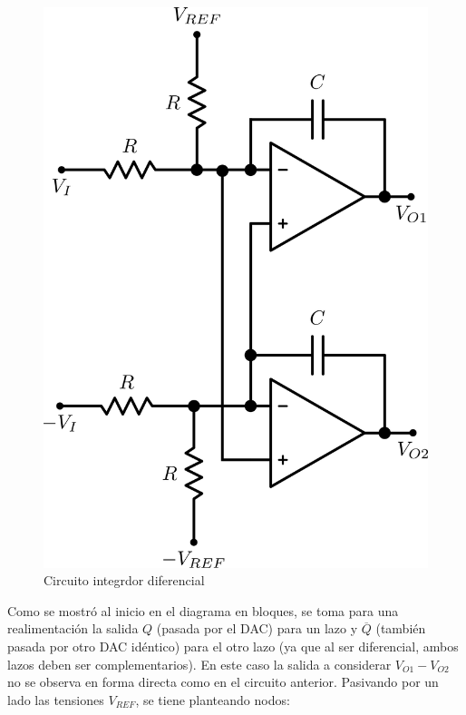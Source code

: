 \documentclass[assd_tp3_main.tex]{subfiles}
\begin{document}
\begin{figure}[!ht]
\begin{centering}
\includegraphics[scale=0.45]{images/ej5/IntegradorDif.png}
\par\end{centering}
\caption{Circuito integrdor diferencial}
\end{figure}

Como se mostró al inicio en el diagrama en bloques, se toma para una realimentación la salida $Q$ (pasada por el DAC) para un lazo y $\overline{Q}$ (también pasada por otro DAC idéntico) para el otro lazo (ya que al ser diferencial, ambos lazos deben ser complementarios). En este caso la salida a considerar $V_{O1} - V_{O2}$ no se observa en forma directa como en el circuito anterior. Pasivando por un lado las tensiones $V_{REF}$, se tiene planteando nodos:
\end{document}

